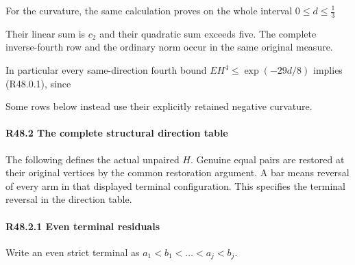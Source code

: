 For the curvature, the same calculation proves on the whole interval \(0 \le  d \le  \frac{1}{3}\)



Their linear sum is \(c_2\) and their quadratic sum exceeds five. The complete inverse-fourth row and the ordinary norm occur in the same original measure.

In particular every same-direction fourth bound \(E H^4 \le  \exp(-29d/8)\) implies (R48.0.1), since


Some rows below instead use their explicitly retained negative curvature.

\paragraph{R48.2 The complete structural direction table}\label{part:R48.2}

The following defines the actual unpaired \(H\). Genuine equal pairs are restored at their original vertices by the common restoration argument. A bar means reversal of every arm in that displayed terminal configuration. This specifies the terminal reversal in the direction table.

\paragraph{R48.2.1 Even terminal residuals}\label{part:R48.2.1}

Write an even strict terminal as \(a_{1} < b_{1} < \ldots < a_{j} < b_{j}\).


